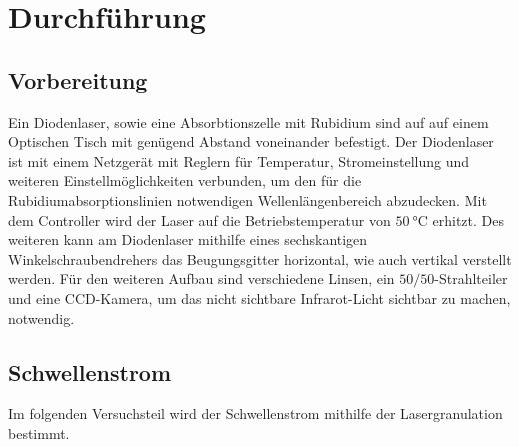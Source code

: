 \section{Durchführung}
\label{sec:Durchführung}

\subsection{Vorbereitung}
Ein Diodenlaser, sowie eine Absorbtionszelle mit Rubidium sind auf
auf einem Optischen Tisch mit genügend Abstand voneinander befestigt.
Der Diodenlaser ist mit einem Netzgerät mit Reglern für
Temperatur, Stromeinstellung und weiteren Einstellmöglichkeiten
verbunden, um den für die Rubidiumabsorptionslinien notwendigen Wellenlängenbereich abzudecken.
Mit dem Controller wird der Laser auf die Betriebstemperatur von $\qty{50}{\degreeCelsius}$ erhitzt.
Des weiteren kann am Diodenlaser mithilfe eines sechskantigen
Winkelschraubendrehers das Beugungsgitter horizontal, wie auch vertikal verstellt werden.
Für den weiteren Aufbau sind verschiedene Linsen, ein $50 / 50$-Strahlteiler
und eine CCD-Kamera, um das nicht sichtbare Infrarot-Licht sichtbar zu machen, notwendig.

\subsection{Schwellenstrom}
Im folgenden Versuchsteil wird der Schwellenstrom mithilfe der Lasergranulation bestimmt.
